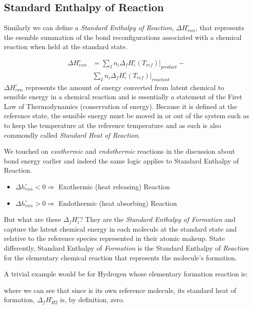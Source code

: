 \documentclass[twocolumn]{memoir} %
\makeatletter
\newcommand\reaction@[1]{\begin{equation}\ce{#1}\end{equation}}
\newcommand\reaction@nonumber[1]%
        {\begin{equation*}\ce{#1}\end{equation*}}
\newcommand\reaction{\@ifstar{\reaction@nonumber}{\reaction@}}
\makeatother
\begin{document}
\subsection{Standard Enthalpy of Reaction}
Similarly we can define a \emph{Standard Enthalpy of Reaction}, $\Delta H^\circ_{rxn}$, that represents 
the esemble summation of the bond reconfigurations associated with a chemical reaction when held at the
standard state.  

\begin{equation}
    \begin{split}
        \Delta H^\circ_{rxn} &= \sum_I n_i \Delta_f H_{i}^\circ(T_{ref}) \vert_{product} - \\ 
        &\sum_I n_i \Delta_f H_{i}^\circ(T_{ref}) \vert_{reactant}
    \end{split}
    \label{eq:standard_enthalpy_reaction}
\end{equation}
%
$\Delta H^\circ_{rxn}$ represents the amount of energy converted from latent chemical to sensible energy
in a chemical reaction and is essentially a statement of the First Law of Thermodynamics (conservation of 
energy).  Because it is defined at the reference state, the sensible energy must be
moved in or out of the system such as to keep the temperature at the reference temperature and as such 
is also commondly called \emph{Standard Heat of Reaction}.

We touched on \emph{exothermic} and \emph{endothermic} reactions in the discussion about bond energy
earlier and indeed the same logic applies to Standard Enthalpy of Reaction.  
%
\begin{itemize}
    \item $\Delta h^\circ_{rxn} < 0 \Rightarrow$ Exothermic (heat releasing) Reaction
    \item $\Delta h^\circ_{rxn} > 0 \Rightarrow$ Endothermic (heat absorbing) Reaction
\end{itemize}
%
But what are these $\Delta_f H_{i}^\circ$?  They are the \emph{Standard Enthalpy of Formation} and capture
the latent chemical energy in each molecule at the standard state and relative to the reference species
represented in their atomic makeup.  State differently, Standard Enthalpy of \emph{Formation} is the Standard
Enthalpy of \emph{Reaction} for the elementary chemical reaction that represents the molecule's formation.

A trivial example would be for Hydrogen whose elementary formation reaction is:

\reaction{H2 (g) -> H2 (g) + $\Delta_f H_{H2}^\circ$}
%
where we can see that since  is its own reference molecule, its standard heat of formation,
$\Delta_f H_{H2}^\circ$ is, by definition, zero.
\end{document}
